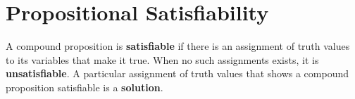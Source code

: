 %

\section{Propositional Satisfiability}

A compound proposition is \textbf{satisfiable} if there is an assignment of truth values to its variables that make it true.
When no such assignments exists, it is \textbf{unsatisfiable}.
A particular assignment of truth values that shows a compound proposition satisfiable is a \textbf{solution}.


